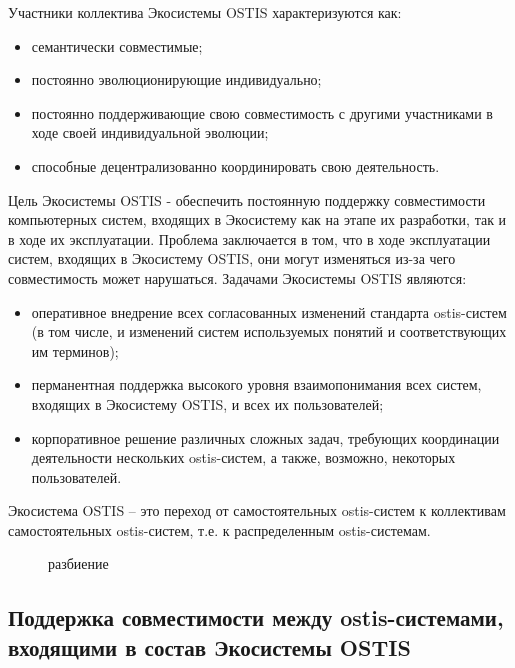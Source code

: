 Участники коллектива Экосистемы OSTIS характеризуются как:
\begin{itemize}
    \item{семантически совместимые;}
    \item{постоянно эволюционирующие индивидуально;}
    \item{постоянно поддерживающие свою совместимость с другими участниками в ходе своей индивидуальной эволюции;}
    \item{способные децентрализованно координировать свою деятельность.}
\end{itemize}

Цель Экосистемы OSTIS - обеспечить постоянную поддержку совместимости компьютерных систем, входящих в Экосистему как на этапе их разработки, так и в ходе их эксплуатации. 
Проблема заключается в том, что в ходе эксплуатации систем, входящих в Экосистему OSTIS, они могут изменяться из-за чего совместимость может нарушаться. 
Задачами Экосистемы OSTIS являются:
\begin{itemize}
    \item{оперативное внедрение всех согласованных изменений стандарта ostis-систем (в том числе, и изменений систем используемых понятий и соответствующих им терминов);}
    \item{перманентная поддержка высокого уровня взаимопонимания всех систем, входящих в Экосистему OSTIS, и всех их пользователей;}
    \item{корпоративное решение различных сложных задач, требующих координации деятельности нескольких ostis-систем, а также, возможно, некоторых пользователей.}
\end{itemize}

Экосистема OSTIS – это переход от самостоятельных ostis-систем к коллективам самостоятельных ostis-систем, т.е. к распределенным ostis-системам.

\begin{figure}[htbp]
\begin{SCn}
\begin{scnrelfromset}{разбиение}
\end{scnrelfromset}
\end{SCn}
\end{figure}


\subsection{Поддержка совместимости между ostis-системами, входящими в состав Экосистемы OSTIS}
{\label{sec_ecosystem_interoperability_support}} 


